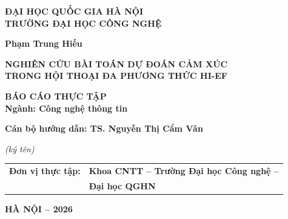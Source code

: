 \begin{titlepage}
\centering
{\fontsize{12}{14}\selectfont\textbf{ĐẠI HỌC QUỐC GIA HÀ NỘI}\\
\textbf{TRƯỜNG ĐẠI HỌC CÔNG NGHỆ}\par}
\vspace{2.2cm}
{\fontsize{14}{16}\selectfont\textbf{Phạm Trung Hiếu}\par}
\vspace{2.2cm}
{\fontsize{18}{24}\selectfont\textbf{NGHIÊN CỨU BÀI TOÁN DỰ ĐOÁN CẢM XÚC\\TRONG HỘI THOẠI ĐA PHƯƠNG THỨC HI-EF}\par}
\vspace{2.6cm}
{\fontsize{14}{16}\selectfont\textbf{BÁO CÁO THỰC TẬP}\\[4pt]
\textbf{Ngành: Công nghệ thông tin}\par}
\vspace{2.4cm}
\raggedright\leftskip=1.2cm
{\fontsize{14}{16}\selectfont\textbf{Cán bộ hướng dẫn: TS. Nguyễn Thị Cẩm Vân}\par}
{\fontsize{11}{13}\selectfont\itshape (ký tên)\par}
\vspace{1.6cm}
{\fontsize{14}{16}\selectfont\begin{tabular}{@{}l@{\ }l@{}}\textbf{Đơn vị thực tập:} & \textbf{Khoa CNTT -- Trường Đại học Công nghệ --}\\ & \textbf{Đại học QGHN}\end{tabular}\par}
\vfill
\centering
{\fontsize{12}{14}\selectfont\textbf{HÀ NỘI -- 2026}\par}
\vspace*{0.3cm}
\noindent{}
\end{titlepage}
